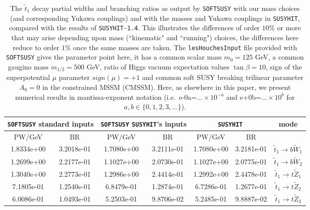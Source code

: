 \documentclass[final,3p,times,pdflatex]{elsarticle}
\begin{document}
\begin{center}
\begin{table}
\centering
\begin{tabular}{|c|c|c|c|c|c|c|} \hline
\multicolumn{2}{|c|}{{\tt SOFTSUSY} standard inputs} & \multicolumn{2}{c|}{{\tt SOFTSUSY} {\tt SUSYHIT}'s inputs} & \multicolumn{2}{c|}{{\tt SUSYHIT}} & mode \\ \hline
PW/GeV & BR & PW/GeV & BR & PW/GeV & BR &  \\ \hline
1.8334e+00 & 3.2018e-01 & 1.7080e+00 & 3.2111e-01 & 1.7080e+00 & 3.2181e-01 & $\tilde{t}_1 \rightarrow b \tilde{W}_1$ \\ \hline
1.2699e+00 & 2.2177e-01 & 1.1027e+00 & 2.0730e-01 & 1.1027e+00 & 2.0775e-01 & $\tilde{t}_1 \rightarrow b \tilde{W}_2$ \\ \hline
1.3040e+00 & 2.2773e-01 & 1.2986e+00 & 2.4414e-01 & 1.2992e+00 & 2.4478e-01 & $\tilde{t}_1 \rightarrow t \tilde{Z}_1$ \\ \hline
7.1805e-01 & 1.2540e-01 & 6.8479e-01 & 1.2874e-01 & 6.7286e-01 & 1.2677e-01 & $\tilde{t}_1 \rightarrow t \tilde{Z}_2$ \\ \hline
6.0086e-01 & 1.0493e-01 & 5.2503e-01 & 9.8706e-02 & 5.2485e-01 & 9.8887e-02 & $\tilde{t}_1 \rightarrow t \tilde{Z}_3$ \\ \hline
\end{tabular}
\caption{The $\tilde{t}_1$ decay partial widths and branching ratios as output
  by {\tt SOFTSUSY} with our mass choices (and corresponding Yukawa couplings) and 
  with the masses and Yukawa couplings in {\tt SUSYHIT}, compared with the results of
  {\tt SUSYHIT-1.4}. This illustrates the differences of order $10\%$ or more
  that may arise depending upon mass (``kinematic" and ``running") choices,
  the differences here reduce to order $1\%$ once the same masses are taken. 
  The {\tt lesHouchesInput} file provided with {\tt SOFTSUSY} gives the parameter
  point here, it has a common scalar mass $m_0 = 125$ GeV, a common gaugino
  mass $m_{1/2} = 500$ GeV, ratio of Higgs vacuum expectation values 
  $\tan\beta = 10$, sign of the superpotential $\mu$ parameter $sign(\mu) = +1$
  and common soft SUSY breaking trilinear parameter $A_0 = 0$ in the
  constrained MSSM (CMSSM).  
Here, as elsewhere in this paper,
  we present numerical results in mantissa-exponent notation (i.e.\ e-0a=$\ldots \times 10^{-a}$
  and e+0b=$\ldots \times 10^b$ for $a,b \in \{0,1,2,3, \ldots\}$).} 
\label{stop1table}
\end{table}
\end{center}
\end{document}
